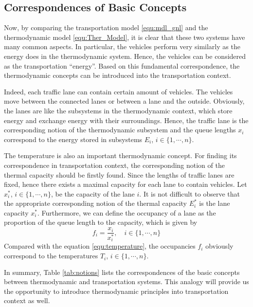 \documentclass[preprint,authoryear,12pt]{elsarticle}
\begin{document}
\subsection{Correspondences of Basic Concepts}

Now, by comparing the transportation model \eqref{equ:mdl_gnl} and the thermodynamic model \eqref{equ:Ther_Model}, it is clear that these two systems have many common aspects. In particular, the vehicles perform very similarly as the energy does in the thermodynamic system. Hence, the vehicles can be considered as the transportation ``energy''. Based on this fundamental correspondence, the thermodynamic concepts can be introduced into the transportation context.

Indeed, each traffic lane can contain certain amount of vehicles. The vehicles move between the connected lanes or between a lane and the outside. Obviously, the lanes are like the subsystems in the thermodynamic context, which store energy and exchange energy with their surroundings. Hence, the traffic lane is the corresponding notion of the thermodynamic subsystem and the queue lengths $x_i$ correspond to the energy stored in subsystems $E_i$, $i\in\{1,\cdots,n\}$.

The temperature is also an important thermodynamic concept. For finding its correspondence in transportation context, the corresponding notion of the thermal capacity should be firstly found. Since the lengths of traffic lanes are fixed, hence there exists a maximal capacity for each lane to contain vehicles. Let $x_i^*$, $i\in\{1,\cdots,n\}$, be the capacity of the lane $i$. It is not difficult to observe that the appropriate corresponding notion of the thermal capacity $E_i^*$ is the lane capacity $x_i^*$. Furthermore, we can define the occupancy of a lane as the proportion of the queue length to the capacity, which is given by
\begin{equation}\label{equ:occupancy}
f_i = \frac{x_i}{x_i^*},\quad i\in\{1,\cdots,n\}
\end{equation}
Compared with the equation \eqref{equ:temperature}, the occupancies $f_i$ obviously correspond to the temperatures $T_i$, $i\in\{1,\cdots,n\}$.

In summary, Table \ref{tab:notions} lists the correspondences of the basic concepts between thermodynamic and transportation systems. This analogy will provide us the opportunity to introduce thermodynamic principles into transportation context as well.
\end{document}
